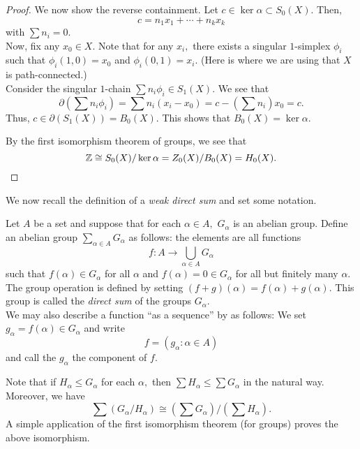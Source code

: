 \documentclass[12pt]{article}
\begin{document}
\begin{proof}
	We now show the reverse containment. Let $c \in \ker\alpha \subset S_0(X).$ Then,
	\begin{equation*} 
		c = n_1x_1 + \cdots + n_kx_k
	\end{equation*}
	with $\sum n_i = 0.$\\
	Now, fix any $x_0 \in X.$ Note that for any $x_i,$ there exists a singular $1$-simplex $\phi_i$ such that $\phi_i(1, 0) = x_0$ and $\phi_i(0, 1) = x_i.$ (Here is where we are using that $X$ is path-connected.)\\
	Consider the singular $1$-chain $\sum n_i\phi_i \in S_1(X).$ We see that
	\begin{equation*} 
		\partial\left(\sum n_i\phi_i\right) = \sum n_i(x_i - x_0) = c - \left(\sum n_i\right)x_0 = c.
	\end{equation*}
	Thus, $c \in \partial(S_1(X)) = B_0(X).$ This shows that $B_0(X) = \ker\alpha.$

	By the first isomorphism theorem of groups, we see that
	\begin{equation*} 
		\mathbb{Z} \cong S_0(X)/\ker\alpha = Z_0(X)/B_0(X) = H_0(X). \qedhere
	\end{equation*}
\end{proof}

We now recall the definition of a \emph{weak direct sum} and set some notation.

\begin{defn}
	Let $A$ be a set and suppose that for each $\alpha \in A,$ $G_\alpha$ is an abelian group. Define an abelian group $\sum_{\alpha\in A}^{}G_\alpha$ as follows: the elements are all functions
	\begin{equation*} 
		f:A \to \bigcup_{\alpha\in A}G_\alpha
	\end{equation*}
	such that $f(\alpha) \in G_\alpha$ for all $\alpha$ and $f(\alpha) = 0 \in G_\alpha$ for all but finitely many $\alpha.$\\
	The group operation is defined by setting $(f + g)(\alpha) = f(\alpha) + g(\alpha).$ This group is called the \emph{direct sum} of the groups $G_\alpha.$ \\
	We may also describe a function ``as a sequence'' by as follows: We set $g_\alpha = f(\alpha) \in G_\alpha$ and write
	\begin{equation*} 
		f = (g_\alpha : \alpha \in A)
	\end{equation*}
	and call the $g_\alpha$ the component of $f.$
\end{defn}

Note that if $H_\alpha \le G_\alpha$ for each $\alpha,$ then $\sum H_\alpha \le \sum G_\alpha$ in the natural way. Moreover, we have
\begin{equation*} 
	\sum (G_\alpha/H_\alpha) \cong \left(\sum G_\alpha\right)/\left(\sum H_\alpha\right).
\end{equation*}
A simple application of the first isomorphism theorem (for groups) proves the above isomorphism.
\end{document}

